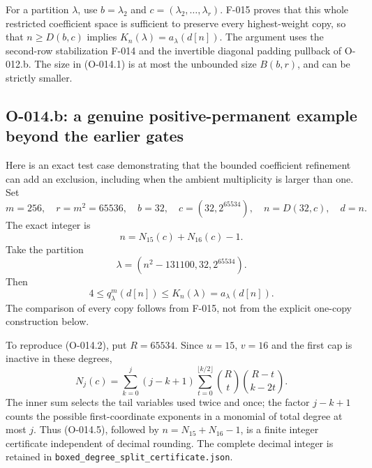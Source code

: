 For a partition $\lambda$, use $b=\lambda_2$ and
$c=(\lambda_2,\ldots,\lambda_r)$. F-015 proves that this
whole restricted coefficient space is sufficient to preserve
every highest-weight copy, so that $n\geq D(b,c)$ implies
$K_n(\lambda)=a_\lambda(d[n])$. The argument uses the
second-row stabilization F-014 and the invertible diagonal
padding pullback of O-012.b. The size in (O-014.1) is at
most the unbounded size $B(b,r)$, and can be strictly smaller.

\subsection{O-014.b: a genuine positive-permanent example beyond the earlier gates}

Here is an exact test case demonstrating that the bounded
coefficient refinement can add an exclusion, including when
the ambient multiplicity is larger than one. Set
\[
 m=256,\quad r=m^2=65536,\quad b=32,\quad
 c=(32,2^{65534}),\quad n=D(32,c),\quad d=n.
\]
The exact integer is
\[
n=N_{15}(c)+N_{16}(c)-1.
                                                               \tag{O-014.2}
\]
Take the partition
\[
                 \lambda=(n^2-131100,32,2^{65534}).     \tag{O-014.3}
\]
Then
\[
              4\leq q^m_\lambda(d[n])\leq K_n(\lambda)
                     =a_\lambda(d[n]).
                                                               \tag{O-014.4}
\]
The comparison of every copy follows from F-015, not from
the explicit one-copy construction below.

To reproduce (O-014.2), put $R=65534$. Since $u=15$, $v=16$
and the first cap is inactive in these degrees,
\[
 N_j(c)=\sum_{k=0}^j(j-k+1)
          \sum_{t=0}^{\lfloor k/2\rfloor}
                         \binom Rt\binom{R-t}{k-2t}.
                                                               \tag{O-014.5}
\]
The inner sum selects the tail variables used twice and once;
the factor $j-k+1$ counts the possible first-coordinate
exponents in a monomial of total degree at most $j$.
Thus (O-014.5), followed by $n=N_{15}+N_{16}-1$, is a
finite integer certificate independent of decimal rounding.
The complete decimal integer is retained in
\texttt{boxed\_degree\_split\_certificate.json}.

